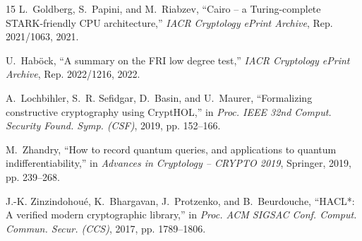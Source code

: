 \documentclass[conference]{IEEEtran}
\theoremstyle{definition}
\begin{document}
\begin{thebibliography}{15}
L.~Goldberg, S.~Papini, and M.~Riabzev, ``Cairo -- a {Turing}-complete {STARK}-friendly {CPU} architecture,'' \emph{IACR Cryptology ePrint Archive}, Rep. 2021/1063, 2021.

U.~Hab{\"o}ck, ``A summary on the {FRI} low degree test,'' \emph{IACR Cryptology ePrint Archive}, Rep. 2022/1216, 2022.

A.~Lochbihler, S.~R. Sefidgar, D.~Basin, and U.~Maurer, ``Formalizing constructive cryptography using {CryptHOL},'' in \emph{Proc. IEEE 32nd Comput. Security Found. Symp. (CSF)}, 2019, pp. 152--166.

M.~Zhandry, ``How to record quantum queries, and applications to quantum indifferentiability,'' in \emph{Advances in Cryptology -- CRYPTO 2019}, Springer, 2019, pp. 239--268.

J.-K. Zinzindohou{\'e}, K.~Bhargavan, J.~Protzenko, and B.~Beurdouche, ``{HACL*}: A verified modern cryptographic library,'' in \emph{Proc. ACM SIGSAC Conf. Comput. Commun. Secur. (CCS)}, 2017, pp. 1789--1806.

\end{thebibliography}
\end{document}
